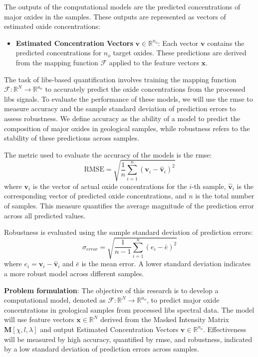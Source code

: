 The outputs of the computational models are the predicted concentrations of major oxides in the samples.
These outputs are represented as vectors of estimated oxide concentrations:

\begin{itemize}
    \item \textbf{Estimated Concentration Vectors} $\mathbf{v} \in \mathbb{R}^{n_o}$: Each vector $\mathbf{v}$ contains the predicted concentrations for $n_o$ target oxides. These predictions are derived from the mapping function $\mathcal{F}$ applied to the feature vectors $\mathbf{x}$.
\end{itemize}

The task of \gls{libs}-based quantification involves training the mapping function $\mathcal{F}: \mathbb{R}^N \rightarrow \mathbb{R}^{n_o}$ to accurately predict the oxide concentrations from the processed \gls{libs} signals.
To evaluate the performance of these models, we will use the \gls{rmse} to measure accuracy and the sample standard deviation of prediction errors to assess robustness.
We define accuracy as the ability of a model to predict the composition of major oxides in geological samples, while robustness refers to the stability of these predictions across samples.

The metric used to evaluate the accuracy of the models is the \gls{rmse}:
\[
\text{RMSE} = \sqrt{\frac{1}{n} \sum_{i=1}^{n} (\mathbf{v}_i - \hat{\mathbf{v}}_i)^2}
\]
where \( \mathbf{v}_i \) is the vector of actual oxide concentrations for the \( i \)-th sample, \( \hat{\mathbf{v}}_i \) is the corresponding vector of predicted oxide concentrations, and \( n \) is the total number of samples. This measure quantifies the average magnitude of the prediction error across all predicted values.

Robustness is evaluated using the sample standard deviation of prediction errors:
\[
\sigma_{error} = \sqrt{\frac{1}{n-1} \sum_{i=1}^{n} (e_i - \bar{e})^2}
\]
where \( e_i = \mathbf{v}_i - \hat{\mathbf{v}}_i \) and \( \bar{e} \) is the mean error.
A lower standard deviation indicates a more robust model across different samples.

\textbf{Problem formulation}:
The objective of this research is to develop a computational model, denoted as $\mathcal{F}: \mathbb{R}^N \rightarrow \mathbb{R}^{n_o}$, to predict major oxide concentrations in geological samples from processed \gls{libs} spectral data. The model will use feature vectors $\mathbf{x} \in \mathbb{R}^N$ derived from the Masked Intensity Matrix $\mathbf{M}[\chi, l, \lambda]$ and output Estimated Concentration Vectors $\mathbf{v} \in \mathbb{R}^{n_o}$. Effectiveness will be measured by high accuracy, quantified by \gls{rmse}, and robustness, indicated by a low standard deviation of prediction errors across samples.


